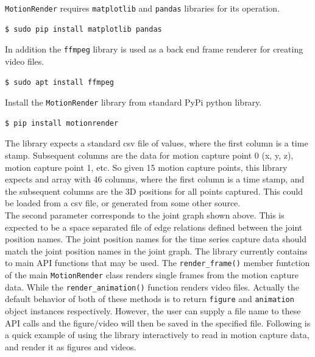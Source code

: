 \documentclass[10pt,a4paper]{article}
\begin{document}
\verb|MotionRender| requires \verb|matplotlib| and
\verb|pandas| libraries for its operation.

\begin{verbatim}
$ sudo pip install matplotlib pandas
\end{verbatim}

In addition the \verb|ffmpeg| library is used as a back end
frame renderer for creating video files.

\begin{verbatim}
$ sudo apt install ffmpeg
\end{verbatim}

Install the \verb|MotionRender| library from standard PyPi python library.

\begin{verbatim}
$ pip install motionrender
\end{verbatim}

The library expects a standard csv file of values, where the first column is
a time stamp.  Subsequent columns are the data for motion capture
point 0 (x, y, z), motion capture point 1, etc.  So given 15 motion
capture points, this library expects and array with 46 columns, where
the first column is a time stamp, and the subsequent columns are the
3D positions for all points captured.  This could be loaded from
a csv file, or generated from some other source.
\\

The second parameter corresponds to the joint graph shown above.  This
is expected to be a space separated file of edge relations defined
between the joint position names.  The joint position names for the
time series capture data should match the joint position names in the
joint graph.  The library currently contains to main API functions that
may be used.  The \verb|render_frame()| member funtction of the
main \verb|MotionRender| class renders single frames from the motion
capture data.  While the \verb|render_animation()| function
renders video files.  Actually the default behavior of both of these
methods is to return \verb|figure| and \verb|animation|
object instances respectively.  However, the user can supply
a file name to these API calls and the figure/video will then be
saved in the specified file.  Following is a quick example of using
the library interactively to read in motion capture data,
and render it as figures and videos.
\end{document}
